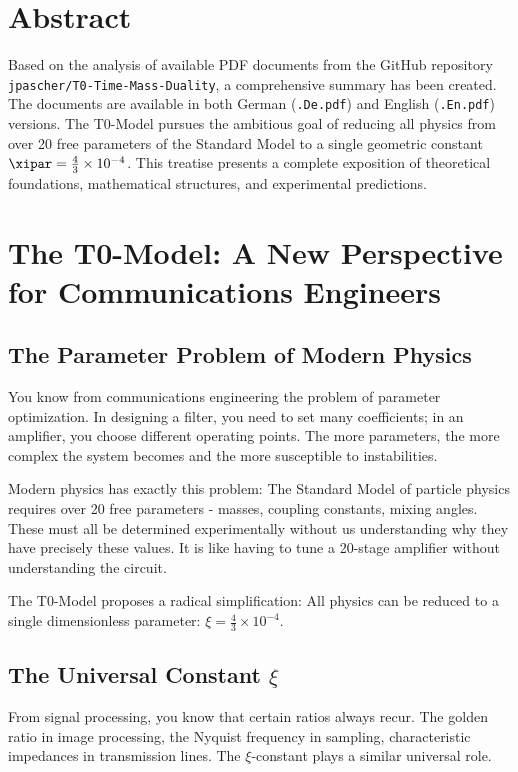 \section*{Abstract}
Based on the analysis of available PDF documents from the GitHub repository \texttt{jpascher/T0-Time-Mass-Duality}, a comprehensive summary has been created. The documents are available in both German (\texttt{.De.pdf}) and English (\texttt{.En.pdf}) versions. The T0-Model pursues the ambitious goal of reducing all physics from over 20 free parameters of the Standard Model to a single geometric constant $\xipar = \frac{4}{3} \times 10^{-4}$. This treatise presents a complete exposition of theoretical foundations, mathematical structures, and experimental predictions.


\section{The T0-Model: A New Perspective for Communications Engineers}

\subsection{The Parameter Problem of Modern Physics}

You know from communications engineering the problem of parameter optimization. In designing a filter, you need to set many coefficients; in an amplifier, you choose different operating points. The more parameters, the more complex the system becomes and the more susceptible to instabilities.

Modern physics has exactly this problem: The Standard Model of particle physics requires over 20 free parameters - masses, coupling constants, mixing angles. These must all be determined experimentally without us understanding why they have precisely these values. It is like having to tune a 20-stage amplifier without understanding the circuit.

The T0-Model proposes a radical simplification: All physics can be reduced to a single dimensionless parameter: $\xi = \frac{4}{3} \times 10^{-4}$.

\subsection{The Universal Constant $\xi$}

From signal processing, you know that certain ratios always recur. The golden ratio in image processing, the Nyquist frequency in sampling, characteristic impedances in transmission lines. The $\xi$-constant plays a similar universal role.

